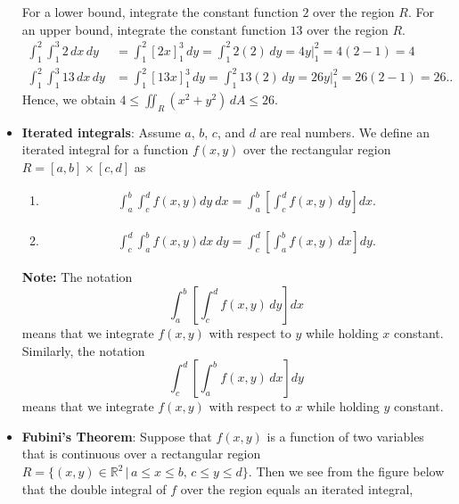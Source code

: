 \documentclass{report}
\begin{document}
\begin{itemize}
            For a lower bound, integrate the constant function $2$ over the region $R$. For an upper bound, integrate the constant function $13$ over the region $R$.
            \begin{align*}
                \int_{1}^{2} \int_{1}^{3} 2 \, dx \, dy &= \int_{1}^{2} [2x]_{1}^{3} \, dy = \int_{1}^{2} 2(2) \, dy = 4y \bigg|_{1}^{2} = 4(2-1) = 4 \\
             \int_{1}^{2} \int_{1}^{3} 13 \, dx \, dy  &= \int_{1}^{2} [13x]_{1}^{3} \, dy = \int_{1}^{2} 13(2) \, dy = 26y \bigg|_{1}^{2} = 26(2-1) = 26.
            .\end{align*}
            Hence, we obtain $4 \leq \iint_{R} (x^2 + y^2) \, dA \leq 26$.

        \item \textbf{Iterated integrals}:
            Assume $a$, $b$, $c$, and $d$ are real numbers. We define an iterated integral for a function $f(x,y)$ over the rectangular region $R = [a,b] \times [c,d]$ as
            \begin{enumerate}[label=(\alph*)]
                \item \relax
                \begin{align*}
                    \int_{a}^{b} \int_{c}^{d} f(x,y) dy\ dx = \int_{a}^{b} \left[ \int_{c}^{d} f(x,y) \, dy \right] dx
                .\end{align*}
            \item \relax
                \begin{align*}
                    \int_{c}^{d} \int_{a}^{b} f(x,y) dx\ dy = \int_{c}^{d} \left[ \int_{a}^{b} f(x,y) \, dx \right] dy
                .\end{align*}
            \end{enumerate}
            \bigbreak \noindent 
            \textbf{Note:} The notation 
            \[
                \int_{a}^{b} \left[ \int_{c}^{d} f(x,y) \, dy \right] dx
            \]
            means that we integrate $f(x,y)$ with respect to $y$ while holding $x$ constant. Similarly, the notation 
            \[
                \int_{c}^{d} \left[ \int_{a}^{b} f(x,y) \, dx \right] dy
            \]
            means that we integrate $f(x,y)$ with respect to $x$ while holding $y$ constant.
        \item \textbf{Fubini’s Theorem}:
            Suppose that $f(x,y)$ is a function of two variables that is continuous over a rectangular region $R = \{(x,y) \in \mathbb{R}^2 \,|\, a \leq x \leq b, \, c \leq y \leq d\}$. Then we see from the figure below that the double integral of $f$ over the region equals an iterated integral,

\end{itemize}
\end{document}
